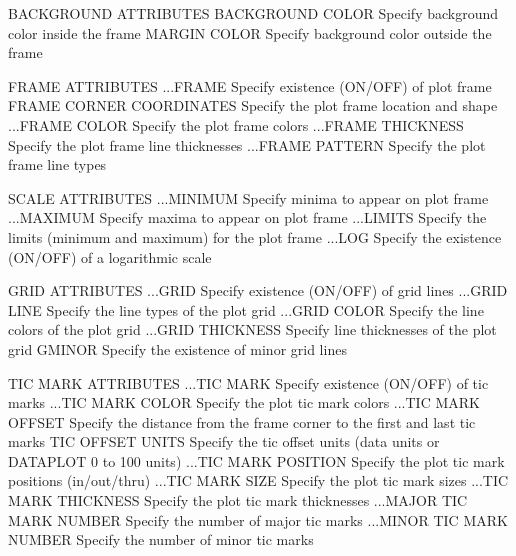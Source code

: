 BACKGROUND ATTRIBUTES
   BACKGROUND COLOR           Specify background color inside the frame
   MARGIN COLOR               Specify background color outside the
                              frame
 
FRAME ATTRIBUTES
   ...FRAME                   Specify existence (ON/OFF) of plot frame
   FRAME CORNER COORDINATES   Specify the plot frame location and shape
   ...FRAME COLOR             Specify the plot frame colors
   ...FRAME THICKNESS         Specify the plot frame line thicknesses
   ...FRAME PATTERN           Specify the plot frame line types
 
SCALE ATTRIBUTES
   ...MINIMUM                 Specify minima to appear on plot frame
   ...MAXIMUM                 Specify maxima to appear on plot frame
   ...LIMITS                  Specify the limits (minimum and maximum)
                              for the plot frame
   ...LOG                     Specify the existence (ON/OFF) of
                              a logarithmic scale
 
GRID ATTRIBUTES
   ...GRID                    Specify existence (ON/OFF) of grid lines
   ...GRID LINE               Specify the line types of the plot grid
   ...GRID COLOR              Specify the line colors of the plot grid
   ...GRID THICKNESS          Specify line thicknesses of the plot grid
   GMINOR                     Specify the existence of minor grid lines
 
TIC MARK ATTRIBUTES
   ...TIC MARK                Specify existence (ON/OFF) of tic marks
   ...TIC MARK COLOR          Specify the plot tic mark colors
   ...TIC MARK OFFSET         Specify the distance from the frame
                              corner to the first and last tic marks
   TIC OFFSET UNITS           Specify the tic offset units (data units
                              or DATAPLOT 0 to 100 units)
   ...TIC MARK POSITION       Specify the plot tic mark positions
                              (in/out/thru)
   ...TIC MARK SIZE           Specify the plot tic mark sizes
   ...TIC MARK THICKNESS      Specify the plot tic mark thicknesses
   ...MAJOR TIC MARK NUMBER   Specify the number of major tic marks
   ...MINOR TIC MARK NUMBER   Specify the number of minor tic marks
 
